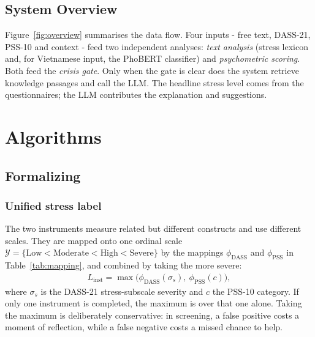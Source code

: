 \subsection{System Overview}
Figure~\ref{fig:overview} summarises the data flow. Four inputs - free text, DASS-21, PSS-10 and context - feed two independent analyses: \textit{text analysis} (stress lexicon and, for Vietnamese input, the PhoBERT classifier) and \textit{psychometric scoring}. Both feed the \textit{crisis gate}. Only when the gate is clear does the system retrieve knowledge passages and call the LLM. The headline stress level comes from the questionnaires; the LLM contributes the explanation and suggestions.


\section{Algorithms}

\subsection{Formalizing}

\subsubsection{Unified stress label}
The two instruments measure related but different constructs and use different scales. They are mapped onto one ordinal scale $\mathcal{Y}=\{\text{Low}<\text{Moderate}<\text{High}<\text{Severe}\}$ by the mappings $\phi_{\text{DASS}}$ and $\phi_{\text{PSS}}$ in Table~\ref{tab:mapping}, and combined by taking the more severe:
\begin{align}
	L_{\text{inst}} = \max\big(\phi_{\text{DASS}}(\sigma_s),\ \phi_{\text{PSS}}(c)\big), \label{eq:label}
\end{align}
where $\sigma_s$ is the DASS-21 stress-subscale severity and $c$ the PSS-10 category. If only one instrument is completed, the maximum is over that one alone. Taking the maximum is deliberately conservative: in screening, a false positive costs a moment of reflection, while a false negative costs a missed chance to help.

